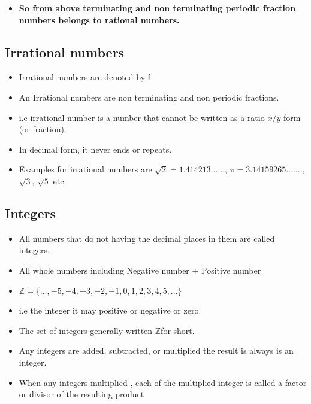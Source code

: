\documentclass[]{book}
\providecommand{\tightlist}{%
  \setlength{\itemsep}{0pt}\setlength{\parskip}{0pt}}
\begin{document}
\begin{itemize}
\tightlist
\item
  \textbf{So from above terminating and non terminating periodic fraction numbers belongs to rational numbers.}
\end{itemize}

\hypertarget{irrational-numbers}{%
\subsection{Irrational numbers}\label{irrational-numbers}}

\begin{itemize}
\tightlist
\item
  Irrational numbers are denoted by \(\mathbb{I}\)
\item
  An Irrational numbers are non terminating and non periodic fractions.
\item
  i.e irrational number is a number that cannot be written as a ratio \(x/y\) form (or fraction).
\item
  In decimal form, it never ends or repeats.
\item
  Examples for irrational numbers are \(\sqrt{2} = 1.414213......\), \(\pi = 3.14159265.......\), \(\sqrt{3}\), \(\sqrt{5}\) etc.
\end{itemize}

\hypertarget{integers}{%
\subsection{Integers}\label{integers}}

\begin{itemize}
\tightlist
\item
  All numbers that do not having the decimal places in them are called integers.
\item
  All whole numbers including Negative number + Positive number
\item
  \(\mathbb{Z} = \{...,-5,-4,-3,-2,-1,0,1,2,3,4,5,...\}\)
\item
  i.e the integer it may positive or negative or zero.
\item
  The set of integers generally written \(\mathbb{Z}\)for short.
\item
  Any integers are added, subtracted, or multiplied the result is always is an integer.
\item
  When any integers multiplied , each of the multiplied integer is called a factor or divisor of the resulting product
\end{itemize}
\end{document}

